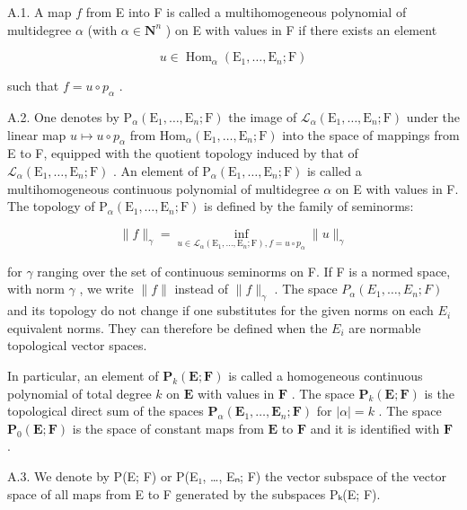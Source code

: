 A.1. A map \(f\) from E into F is called a multihomogeneous polynomial of multidegree \(\alpha\) (with \(\alpha \in \mathbf{N}^{n}\) ) on E with values in F if there exists an element

\[
u \in \operatorname{Hom} _ {\alpha} (\mathrm{E} _ {1}, \dots , \mathrm{E} _ {n}; \mathrm{F})
\]

such that \(f = u \circ p_{\alpha}\) .

A.2. One denotes by \(\mathrm{P}_{\alpha}(\mathrm{E}_{1},\ldots,\mathrm{E}_{n};\mathrm{F})\) the image of \(\mathcal{L}_{\alpha}(\mathrm{E}_{1},\ldots,\mathrm{E}_{n};\mathrm{F})\) under the linear map \(u\mapsto u\circ p_{\alpha}\) from \(\mathrm{Hom}_{\alpha}(\mathrm{E}_{1},\ldots,\mathrm{E}_{n};\mathrm{F})\) into the space of mappings from E to F, equipped with the quotient topology induced by that of \(\mathcal{L}_{\alpha}(\mathrm{E}_{1},\ldots,\mathrm{E}_{n};\mathrm{F})\) . An element of \(\mathrm{P}_{\alpha}(\mathrm{E}_{1},\ldots,\mathrm{E}_{n};\mathrm{F})\) is called a multihomogeneous continuous polynomial of multidegree \(\alpha\) on E with values in F. The topology of \(\mathrm{P}_{\alpha}(\mathrm{E}_{1},\ldots,\mathrm{E}_{n};\mathrm{F})\) is defined by the family of seminorms:

\[
\| f \| _ {\gamma} = \inf _ {u \in \mathscr {L} _ {\alpha} (\mathrm{E} _ {1}, \dots , \mathrm{E} _ {n}; \mathrm{F}), f = u \circ p _ {\alpha}} \| u \| _ {\gamma}
\]

for \(\gamma\) ranging over the set of continuous seminorms on F. If F is a normed space, with norm \(\gamma\) , we write \(\|f\|\) instead of \(\|f\|_{\gamma}\) . The space \(P_{\alpha}(E_{1},\ldots,E_{n};F)\) and its topology do not change if one substitutes for the given norms on each \(E_{i}\) equivalent norms. They can therefore be defined when the \(E_{i}\) are normable topological vector spaces.

In particular, an element of \(\mathbf{P}_{k}(\mathbf{E};\mathbf{F})\) is called a homogeneous continuous polynomial of total degree \(k\) on \(\mathbf{E}\) with values in \(\mathbf{F}\) . The space \(\mathbf{P}_{k}(\mathbf{E};\mathbf{F})\) is the topological direct sum of the spaces \(\mathbf{P}_{\alpha}(\mathbf{E}_{1},\ldots,\mathbf{E}_{n};\mathbf{F})\) for \(|\alpha| = k\) . The space \(\mathbf{P}_{0}(\mathbf{E};\mathbf{F})\) is the space of constant maps from \(\mathbf{E}\) to \(\mathbf{F}\) and it is identified with \(\mathbf{F}\) .

A.3. We denote by P(E; F) or P(E₁, \ldots, Eₙ; F) the vector subspace of the vector space of all maps from E to F generated by the subspaces Pₖ(E; F).

